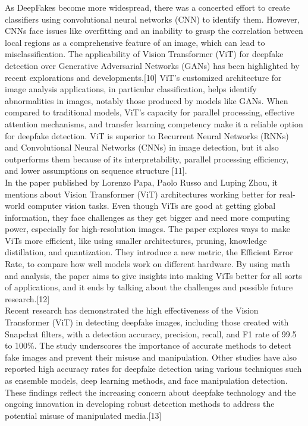 As DeepFakes become more widespread, there was a concerted effort to create classifiers using convolutional neural networks (CNN) to identify them. However, CNNs face issues like overfitting and an inability to grasp the correlation between local regions as a comprehensive feature of an image, which can lead to misclassification. The applicability of Vision Transformer (ViT) for deepfake detection over Generative Adversarial Networks (GANs) has been highlighted by recent explorations and developments.[10] ViT's customized architecture for image analysis applications, in particular classification, helps identify abnormalities in images, notably those produced by models like GANs. When compared to traditional models, ViT's capacity for parallel processing, effective attention mechanisms, and transfer learning competency make it a reliable option for deepfake detection. ViT is superior to Recurrent Neural Networks (RNNs) and Convolutional Neural Networks (CNNs) in image detection, but it also outperforms them because of its interpretability, parallel processing efficiency, and lower assumptions on sequence structure [11].\\

In the paper published by Lorenzo Papa, Paolo Russo and Luping Zhou, it mentions about Vision Transformer (ViT) architectures working better for real-world computer vision tasks. Even though ViTs are good at getting global information, they face challenges as they get bigger and need more computing power, especially for high-resolution images. The paper explores ways to make ViTs more efficient, like using smaller architectures, pruning, knowledge distillation, and quantization. They introduce a new metric, the Efficient Error Rate, to compare how well models work on different hardware. By using math and analysis, the paper aims to give insights into making ViTs better for all sorts of applications, and it ends by talking about the challenges and possible future research.[12]\\

Recent research has demonstrated the high effectiveness of the Vision Transformer (ViT) in detecting deepfake images, including those created with Snapchat filters, with a detection accuracy, precision, recall, and F1 rate of 99.5 to 100\%. The study underscores the importance of accurate methods to detect fake images and prevent their misuse and manipulation. Other studies have also reported high accuracy rates for deepfake detection using various techniques such as ensemble models, deep learning methods, and face manipulation detection. These findings reflect the increasing concern about deepfake technology and the ongoing innovation in developing robust detection methods to address the potential misuse of manipulated media.[13]\\


